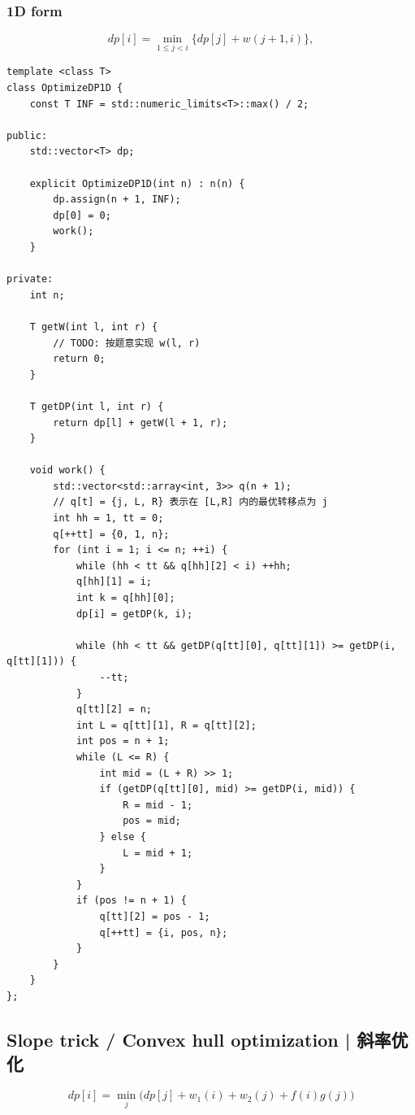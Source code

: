     \subsubsection{1D form}
        \[
            dp[i] = \min_{1 \le j < i} \{ dp[j] + w(j+1,i) \},
        \]

        \begin{lstlisting}
template <class T>
class OptimizeDP1D {
    const T INF = std::numeric_limits<T>::max() / 2;

public:
    std::vector<T> dp;

    explicit OptimizeDP1D(int n) : n(n) {
        dp.assign(n + 1, INF);
        dp[0] = 0;
        work();
    }

private:
    int n;

    T getW(int l, int r) {
        // TODO: 按题意实现 w(l, r)
        return 0;
    }

    T getDP(int l, int r) {
        return dp[l] + getW(l + 1, r);
    }

    void work() {
        std::vector<std::array<int, 3>> q(n + 1);
        // q[t] = {j, L, R} 表示在 [L,R] 内的最优转移点为 j
        int hh = 1, tt = 0;
        q[++tt] = {0, 1, n};
        for (int i = 1; i <= n; ++i) {
            while (hh < tt && q[hh][2] < i) ++hh;
            q[hh][1] = i;
            int k = q[hh][0];
            dp[i] = getDP(k, i);

            while (hh < tt && getDP(q[tt][0], q[tt][1]) >= getDP(i, q[tt][1])) {
                --tt;
            }
            q[tt][2] = n;
            int L = q[tt][1], R = q[tt][2];
            int pos = n + 1;
            while (L <= R) {
                int mid = (L + R) >> 1;
                if (getDP(q[tt][0], mid) >= getDP(i, mid)) {
                    R = mid - 1;
                    pos = mid;
                } else {
                    L = mid + 1;
                }
            }
            if (pos != n + 1) {
                q[tt][2] = pos - 1;
                q[++tt] = {i, pos, n};
            }
        }
    }
};
        \end{lstlisting}

\subsection{Slope trick / Convex hull optimization | 斜率优化}

    \[
        dp[i] = \min_j \bigl(dp[j] + w_1(i) + w_2(j) + f(i)g(j)\bigr)
    \]

